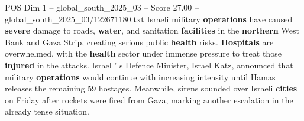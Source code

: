 \begin{textsample}{POS Dim 1 – global\_south\_2025\_03 – Score 27.00 – global\_south\_2025\_03/122671180.txt}
Israeli military \textbf{operations} have caused \textbf{severe} damage to roads, \textbf{water}, and sanitation \textbf{facilities} in the \textbf{northern} West Bank and Gaza Strip, creating serious public \textbf{health} risks. \textbf{Hospitals} are overwhelmed, with the \textbf{health} sector under immense pressure to treat those \textbf{injured} in the attacks.
Israel ' s Defence Minister, Israel Katz, announced that military \textbf{operations} would continue with increasing intensity until Hamas releases the remaining 59 hostages.
Meanwhile, sirens sounded over Israeli \textbf{cities} on Friday after rockets were fired from Gaza, marking another escalation in the already tense situation.

\end{textsample}
